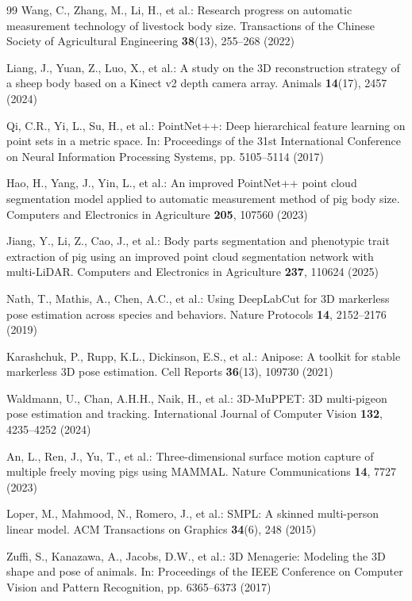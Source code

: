 \documentclass[runningheads]{llncs}
\begin{document}
\begin{thebibliography}{99}
Wang, C., Zhang, M., Li, H., et al.: Research progress on automatic measurement technology of livestock body size. Transactions of the Chinese Society of Agricultural Engineering \textbf{38}(13), 255--268 (2022)

Liang, J., Yuan, Z., Luo, X., et al.: A study on the 3D reconstruction strategy of a sheep body based on a Kinect v2 depth camera array. Animals \textbf{14}(17), 2457 (2024)

Qi, C.R., Yi, L., Su, H., et al.: PointNet++: Deep hierarchical feature learning on point sets in a metric space. In: Proceedings of the 31st International Conference on Neural Information Processing Systems, pp. 5105--5114 (2017)

Hao, H., Yang, J., Yin, L., et al.: An improved PointNet++ point cloud segmentation model applied to automatic measurement method of pig body size. Computers and Electronics in Agriculture \textbf{205}, 107560 (2023)

Jiang, Y., Li, Z., Cao, J., et al.: Body parts segmentation and phenotypic trait extraction of pig using an improved point cloud segmentation network with multi-LiDAR. Computers and Electronics in Agriculture \textbf{237}, 110624 (2025)

Nath, T., Mathis, A., Chen, A.C., et al.: Using DeepLabCut for 3D markerless pose estimation across species and behaviors. Nature Protocols \textbf{14}, 2152--2176 (2019)

Karashchuk, P., Rupp, K.L., Dickinson, E.S., et al.: Anipose: A toolkit for stable markerless 3D pose estimation. Cell Reports \textbf{36}(13), 109730 (2021)

Waldmann, U., Chan, A.H.H., Naik, H., et al.: 3D-MuPPET: 3D multi-pigeon pose estimation and tracking. International Journal of Computer Vision \textbf{132}, 4235--4252 (2024)

An, L., Ren, J., Yu, T., et al.: Three-dimensional surface motion capture of multiple freely moving pigs using MAMMAL. Nature Communications \textbf{14}, 7727 (2023)

Loper, M., Mahmood, N., Romero, J., et al.: SMPL: A skinned multi-person linear model. ACM Transactions on Graphics \textbf{34}(6), 248 (2015)

Zuffi, S., Kanazawa, A., Jacobs, D.W., et al.: 3D Menagerie: Modeling the 3D shape and pose of animals. In: Proceedings of the IEEE Conference on Computer Vision and Pattern Recognition, pp. 6365--6373 (2017)


\end{thebibliography}
\end{document}
